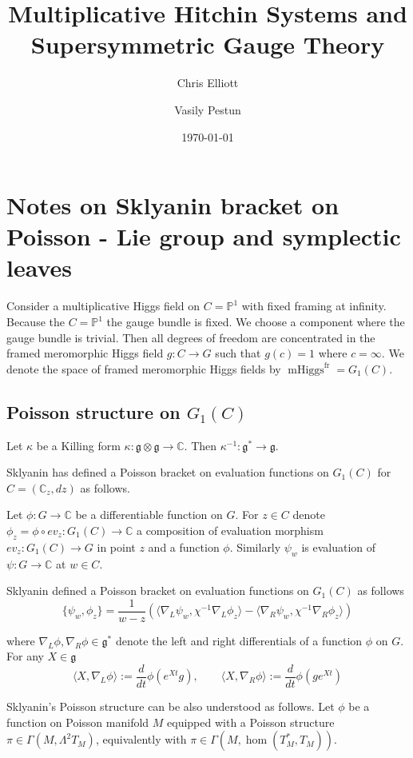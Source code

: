 \documentclass[11pt, oneside, reqno]{amsart}
\title{Multiplicative Hitchin Systems and Supersymmetric Gauge Theory}
\author{Chris Elliott \and Vasily Pestun}
\date{\today}
\theoremstyle{definition} \newtheorem{definition}{Definition}[section]
\theoremstyle{definition} \newtheorem{remark}[definition]{Remark}
\theoremstyle{definition} \newtheorem{remarks}[definition]{Remarks}
\theoremstyle{definition} \newtheorem{question}[definition]{Question}
\theoremstyle{definition} \newtheorem*{note}{Note}
\theoremstyle{definition} \newtheorem{example}[definition]{Example}
\theoremstyle{definition} \newtheorem{examples}[definition]{Examples}
\renewcommand{\gg}{\mathfrak{g}}
\DeclareMathOperator{\mhiggs}{mHiggs}
\newcommand{\fr}{\mathrm{fr}}
\begin{document}
\section{Notes on Sklyanin bracket on Poisson - Lie group
  and symplectic leaves}

Consider a multiplicative Higgs field on $C = \mathbb{P}^{1}$
with fixed framing at infinity. Because the $C = \mathbb{P}^{1}$ the
gauge bundle is fixed. We choose a component where the gauge bundle is trivial.
Then all degrees of freedom are concentrated
in the framed meromorphic Higgs field $g: C \to G$ such that $g(c) = 1$ where $c = \infty$. We denote
the space of framed meromorphic Higgs fields by $\mhiggs^{\fr} = G_1(C)$. 

\subsection{Poisson structure on $G_1(C)$} 
Let $\kappa$ be a Killing form $\kappa: \gg \otimes \gg \to \mathbb{C}$.
Then $\kappa^{-1}: \gg^{*} \to \gg$.

Sklyanin has defined a Poisson bracket on evaluation functions on $G_1(C)$ for $C = (\mathbb{C}_z, dz)$ as follows. 

Let $\phi: G \to \mathbb{C}$ be a differentiable function on $G$. For $z \in C$
denote $\phi_{z} =  \phi \circ ev_{z} : G_1(C) \to \mathbb{C}$ a composition
of evaluation morphism  $ev_{z}: G_1(C) \to G$ in point $z$ and a function $\phi$.
Similarly $\psi_{w}$ is evaluation of $\psi: G \to \mathbb{C}$ at $w \in C$.

Sklyanin defined a Poisson bracket on evaluation functions on $G_1(C)$ as follows
\begin{equation}
\label{eq:Sklyanin}
  \{ \psi_{w}, \phi_{z} \} = \frac{1}{w - z}(\langle \nabla_{L} \psi_w, \chi^{-1} \nabla_{L} \phi_{z}
\rangle  - \langle \nabla_{R} \psi_{w},  \chi^{-1} \nabla_{R} \phi_{z}\rangle)
\end{equation}

where $\nabla_{L}\phi , \nabla_{R}\phi \in \gg^{*} $ denote the left and right differentials
of a function $\phi$ on $G$. For any $X \in \gg$
\begin{equation}
  \langle X, \nabla_{L} \phi \rangle := \frac{d}{dt} \phi(e^{Xt} g),
  \qquad \langle X, \nabla_{R} \phi \rangle := \frac{d}{dt} \phi(g e^{Xt})
\end{equation}

Sklyanin's Poisson structure can be also understood as follows. Let $\phi$ be a function
on Poisson manifold $M$ equipped with a Poisson structure $\pi \in \Gamma(M,\Lambda^2 T_{M})$,
equivalently with $\pi \in \Gamma(M, \hom (T_{M}^{*}, T_{M}))$. 
\end{document}
